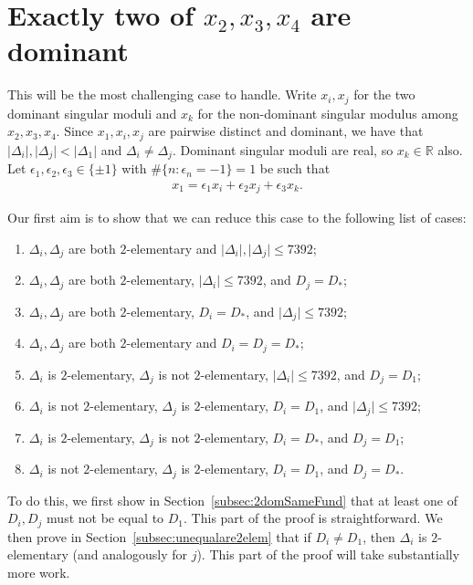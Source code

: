 \documentclass[12pt,a4paper,oneside]{amsart}
\begin{document}
	\section{Exactly two of \texorpdfstring{$x_2, x_3, x_4$}{x2, x3, x4} are dominant}\label{sec:2dom}
	
    This will be the most challenging case to handle.
	Write $x_i, x_j$ for the two dominant singular moduli and $x_k$ for the non-dominant singular modulus among $x_2, x_3, x_4$. Since $x_1, x_i, x_j$ are pairwise distinct and dominant, we have that $\lvert \Delta_i \rvert, \lvert \Delta_j \rvert < \lvert \Delta_1 \rvert$ and $\Delta_i \neq \Delta_j$. Dominant singular moduli are real, so $x_k \in \mathbb{R}$ also. Let $\epsilon_1, \epsilon_2, \epsilon_3 \in \{\pm 1\}$ with $\# \{n : \epsilon_n = -1\} = 1$ be such that
\begin{align}\label{eq:2dom1}
    x_1 = \epsilon_1 x_i + \epsilon_2 x_j + \epsilon_3 x_k.
\end{align} 

Our first aim is to show that we can reduce this case to the following list of cases:

\begin{enumerate}
	\item $\Delta_i, \Delta_j$ are both $2$-elementary and $\lvert \Delta_i \rvert, \lvert \Delta_j \rvert  \leq 7392$;
		\item $\Delta_i, \Delta_j$ are both $2$-elementary, $\lvert \Delta_i \rvert \leq 7392$, and $D_j = D_*$;
			\item $\Delta_i, \Delta_j$ are both $2$-elementary, $D_i = D_*$, and $\lvert \Delta_j \rvert \leq 7392$;
	\item $\Delta_i, \Delta_j$ are both $2$-elementary and $D_i = D_j = D_*$;
	\item $\Delta_i$ is $2$-elementary, $\Delta_j$ is not $2$-elementary, $\lvert \Delta_i \rvert \leq 7392$, and $D_j = D_1$;
	\item $\Delta_i$ is not $2$-elementary, $\Delta_j$ is $2$-elementary, $D_i = D_1$, and $\lvert \Delta_j \rvert \leq 7392$;
	\item $\Delta_i$ is $2$-elementary, $\Delta_j$ is not $2$-elementary, $D_i = D_*$, and $D_j = D_1$;
	\item  $\Delta_i$ is not $2$-elementary, $\Delta_j$ is $2$-elementary, $D_i = D_1$, and $D_j = D_*$.
\end{enumerate}

To do this, we first show in Section~\ref{subsec:2domSameFund} that at least one of $D_i, D_j$ must not be equal to $D_1$.
This part of the proof is straightforward.
We then prove in Section~\ref{subsec:unequalare2elem} that if $D_i \neq D_1$, then $\Delta_i$ is $2$-elementary (and analogously for $j$).
This part of the proof will take substantially more work.
\end{document}
